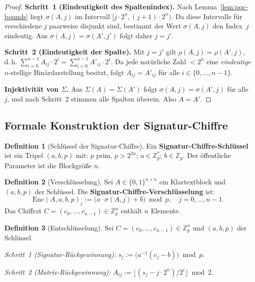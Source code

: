 ﻿\documentclass[a4paper,12pt]{article}
\theoremstyle{definition}
\newtheorem{definition}{Definition}[section]
\begin{document}
\begin{proof}
\textbf{Schritt~1 (Eindeutigkeit des Spaltenindex).}
Nach Lemma~\ref{lem:pqc-bounds} liegt $\sigma(A,j)$ im Intervall
$[j \cdot 2^n, (j+1) \cdot 2^n)$.
Da diese Intervalle für verschiedene $j$ paarweise disjunkt sind,
bestimmt der Wert $\sigma(A,j)$ den Index~$j$ eindeutig.
Aus $\sigma(A,j) = \sigma(A',j')$ folgt daher $j = j'$.

\textbf{Schritt~2 (Eindeutigkeit der Spalte).}
Mit $j = j'$ gilt $\rho(A,j) = \rho(A',j)$, d.\,h.
$\sum_{i=0}^{n-1} A_{ij} \cdot 2^i = \sum_{i=0}^{n-1} A'_{ij} \cdot 2^i$.
Da jede natürliche Zahl $< 2^n$ eine \emph{eindeutige} $n$-stellige Binärdarstellung
besitzt, folgt $A_{ij} = A'_{ij}$ für alle $i \in \{0,\ldots,n-1\}$.

\textbf{Injektivität von $\Sigma$.}
Aus $\Sigma(A) = \Sigma(A')$ folgt $\sigma(A,j) = \sigma(A',j)$ für alle
$j$, und nach Schritt~2 stimmen alle Spalten überein. Also $A = A'$.
\end{proof}

\subsection{Formale Konstruktion der Signatur-Chiffre}

\begin{definition}[Schlüssel der Signatur-Chiffre]
Ein \textbf{Signatur-Chiffre-Schlüssel} ist ein Tripel $(a, b, p)$ mit:
$p$ prim, $p > 2^{2n}$; $a \in \mathbb{Z}_p^*$; $b \in \mathbb{Z}_p$.
Der öffentliche Parameter ist die Blockgröße $n$.
\end{definition}

\begin{definition}[Verschlüsselung]
\label{def:pqc-enc}
Sei $A \in \{0,1\}^{n \times n}$ ein Klartextblock und $(a, b, p)$ der Schlüssel.
Die \textbf{Signatur-Chiffre-Verschlüsselung} ist:
\[
  \mathrm{Enc}(A, a, b, p)_j := \bigl(a \cdot \sigma(A,j) + b\bigr) \bmod p,
  \quad j = 0, \ldots, n-1.
\]
Das Chiffrat $C = (c_0,\ldots,c_{n-1}) \in \mathbb{Z}_p^n$ enthält $n$ Elemente.
\end{definition}

\begin{definition}[Entschlüsselung]
\label{def:pqc-dec}
Sei $C = (c_0,\ldots,c_{n-1}) \in \mathbb{Z}_p^n$ und $(a, b, p)$ der Schlüssel.

\emph{Schritt~1 (Signatur-Rückgewinnung):} $s_j := \bigl(a^{-1}(c_j - b)\bigr) \bmod p$.

\emph{Schritt~2 (Matrix-Rückgewinnung):} $A_{ij} := \bigl\lfloor (s_j - j \cdot 2^n) / 2^i \bigr\rfloor \bmod 2$.
\end{definition}
\end{document}
